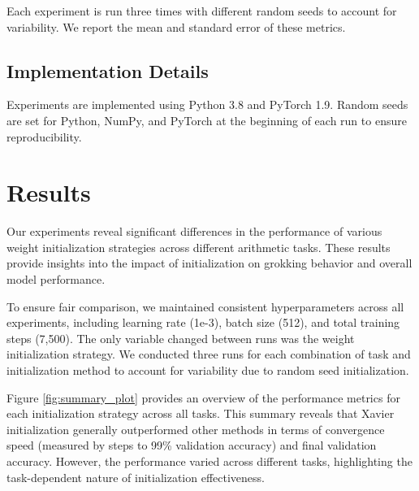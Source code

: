 \documentclass{article} %
\begin{document}
Each experiment is run three times with different random seeds to account for variability. We report the mean and standard error of these metrics.

\subsection{Implementation Details}
Experiments are implemented using Python 3.8 and PyTorch 1.9. Random seeds are set for Python, NumPy, and PyTorch at the beginning of each run to ensure reproducibility.

\section{Results}
\label{sec:results}

Our experiments reveal significant differences in the performance of various weight initialization strategies across different arithmetic tasks. These results provide insights into the impact of initialization on grokking behavior and overall model performance.

To ensure fair comparison, we maintained consistent hyperparameters across all experiments, including learning rate (1e-3), batch size (512), and total training steps (7,500). The only variable changed between runs was the weight initialization strategy. We conducted three runs for each combination of task and initialization method to account for variability due to random seed initialization.

Figure \ref{fig:summary_plot} provides an overview of the performance metrics for each initialization strategy across all tasks. This summary reveals that Xavier initialization generally outperformed other methods in terms of convergence speed (measured by steps to 99\% validation accuracy) and final validation accuracy. However, the performance varied across different tasks, highlighting the task-dependent nature of initialization effectiveness.
\end{document}
